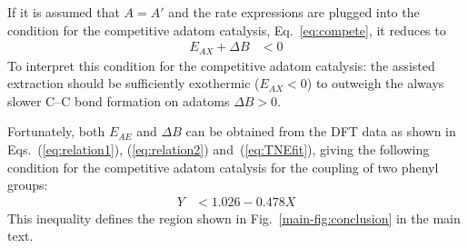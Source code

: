 \documentclass[aps,prl,reprint,amsmath,amssymb,floatfix,notitlepage]{revtex4-1}
\begin{document}
If it is assumed that $A=A'$ and the rate expressions are plugged into the condition for the competitive adatom catalysis, Eq.~\ref{eq:compete}, it reduces to
%
\begin{equation}
\begin{split}
E_{AX} + \Delta B &< 0
\end{split}
\end{equation}
%
To interpret this condition for the competitive adatom catalysis: the assisted extraction should be sufficiently exothermic ($E_{AX} < 0$) to outweigh the always slower C--C bond formation on adatoms $\Delta B > 0$.

Fortunately, both $E_{AE}$ and $\Delta B$ can be obtained from the DFT data as shown in Eqs.~(\ref{eq:relation1}), (\ref{eq:relation2}) and~(\ref{eq:TNEfit}), giving the following condition for the competitive adatom catalysis for the coupling of two phenyl groups:
%
\begin{equation}
\begin{split}
Y &< 1.026 - 0.478 X
\end{split}
\end{equation}
%
This inequality defines the region shown in Fig.~\ref{main-fig:conclusion} in the main text.



\end{document}
